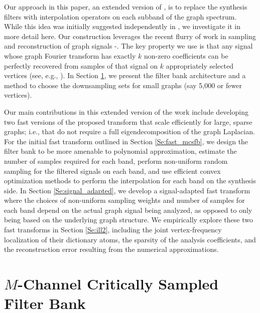 \documentclass[journal, 10pt]{IEEEtran}
\begin{document}
Our approach in this paper, an extended version of \cite{jin_conf}, is to replace the synthesis filters with interpolation operators on each subband of the graph spectrum. While this idea was initially suggested independently in \cite{chen2015discrete}, we investigate it in more detail here. Our construction leverages the recent flurry of work in sampling and reconstruction of graph signals \cite{chen2015discrete}-\nocite{pesenson_paley,narang2013interpolation,anis2014towards,gadde2015probabilistic,shomorony,PuyTGV15,chen2015signal,tsitsvero2016uncertainty,chen2016signal,anis2016efficient}\cite{di2017sampling}. The key property we use is that any signal whose graph Fourier transform has exactly $k$ non-zero coefficients can be perfectly recovered from samples of that signal on $k$ appropriately selected vertices (see, e.g., \cite[Theorem 1]{chen2015discrete} \cite[Proposition 1]{anis2016efficient}). In Section \ref{Se:fb_design}, we present the filter bank architecture and a method to choose the downsampling sets for small graphs 
(say 5,000 or fewer vertices). 

Our main contributions in this extended version of the work include developing two fast versions of the proposed transform that scale efficiently for large, sparse graphs; i.e., that do not require a full eigendecomposition of the graph Laplacian. For the initial fast transform outlined in Section \ref{Se:fast_mcsfb}, we design the filter bank to be more amenable to polynomial approximation, estimate the number of samples required for each band, perform non-uniform random sampling for the filtered signals on each band, and use efficient convex optimization methods to perform the interpolation for each band on the synthesis side. In Section \ref{Se:signal_adapted}, we develop a signal-adapted fast transform where the choices of non-uniform sampling weights and number of samples for each band depend on the actual graph signal being analyzed, as opposed to only being based on the underlying graph structure. We 
empirically explore these two fast transforms in Section \ref{Se:ill2},  including the joint vertex-frequency localization of their dictionary atoms, the sparsity of the analysis coefficients, and the reconstruction error resulting from the numerical approximations.


\section{$M$-Channel Critically Sampled Filter Bank} \label{Se:fb_design}
\end{document}
